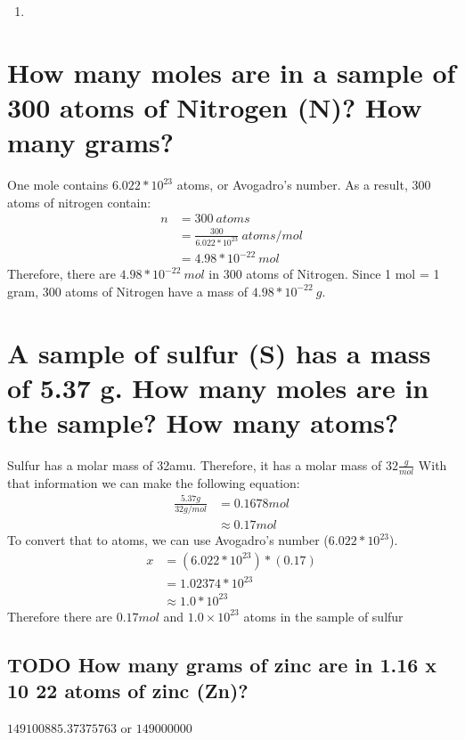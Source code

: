 \documentclass[11pt]{article}
\begin{document}
\begin{enumerate}
\item 
\end{enumerate}

\section{How many moles are in a sample of 300 atoms of Nitrogen (N)? How many grams?}
\label{sec:orgfb28103}
One mole contains \(6.022 *10^{23}\) atoms, or Avogadro's number. As a result, 300 atoms of nitrogen contain:
\begin{align*}
n&=300\ atoms\\
&=\frac{300}{6.022*10^{23}}\ atoms/mol\\
&=4.98*10^{-22}\ mol
\end{align*}
Therefore, there are \(4.98*10^{-22}\ mol\) in 300 atoms of Nitrogen. Since 1 mol = 1 gram, 300 atoms of Nitrogen have a mass of \(4.98*10^{-22}\ g\).

\section{A sample of sulfur (S) has a mass of 5.37 g. How many moles are in the sample? How many atoms?}
\label{sec:org5bea0f5}
Sulfur has a molar mass of 32amu. Therefore, it has a molar mass of
\(32\frac{g}{mol}\)
With that information we can make the following equation:
\begin{align*}
\frac{5.37g}{32g/mol}&=0.1678mol\\
&\approx0.17mol
\end{align*}
To convert that to atoms, we can use Avogadro's number (\(6.022 *10^{23}\)).
\begin{align*}
x&=(6.022*10^{23})*(0.17)\\
&=1.02374*10^{23}\\
&\approx1.0*10^{23}
\end{align*}
Therefore there are \(0.17mol\) and \(1.0\times10^{23}\) atoms in the sample of sulfur

\subsection{{\bfseries\sffamily TODO} How many grams of zinc are in 1.16 x 10 22 atoms of zinc (Zn)?}
\label{sec:org0122310}
\(149100885.37375763\) or \(149000000\)
\end{document}
